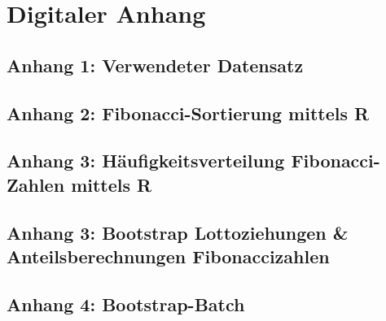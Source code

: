 \documentclass[ngerman,]{article}
\begin{document}
\newpage

\section{Digitaler Anhang}\label{digitaler-anhang}

\subsection{Anhang 1: Verwendeter
Datensatz}\label{anhang-1-verwendeter-datensatz}

\begin{center}

\end{center}

\subsection{Anhang 2: Fibonacci-Sortierung mittels
R}\label{anhang-2-fibonacci-sortierung-mittels-r}

\begin{center}

\end{center}

\subsection{Anhang 3: Häufigkeitsverteilung Fibonacci-Zahlen mittels
R}\label{anhang-3-haufigkeitsverteilung-fibonacci-zahlen-mittels-r}

\begin{center}

\end{center}

\subsection{Anhang 3: Bootstrap Lottoziehungen \& Anteilsberechnungen
Fibonaccizahlen}\label{anhang-3-bootstrap-lottoziehungen-anteilsberechnungen-fibonaccizahlen}

\begin{center}

\end{center}

\subsection{Anhang 4: Bootstrap-Batch}\label{anhang-4-bootstrap-batch}
\end{document}
